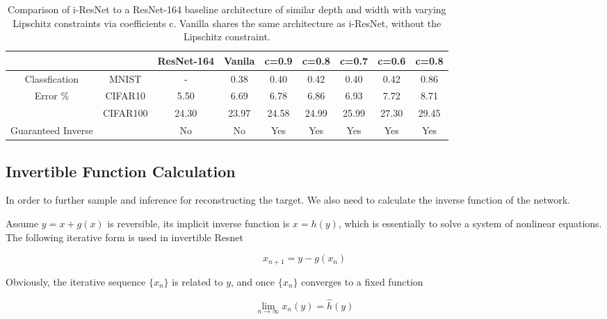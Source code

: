 \documentclass[final]{cvpr}
\begin{document}
\begin{table}[]
   \caption{Comparison of i-ResNet to a ResNet-164 baseline architecture of similar depth and width with varying Lipschitz constraints via
   coefficients c. Vanilla shares the same architecture as i-ResNet, without the Lipschitz constraint.}
   \label{table1}   

   \begin{center}
   \begin{tabular}{@{}ccccccccc@{}}
   \toprule
                      &          & ResNet-164 & Vanila & c=0.9 & c=0.8 & c=0.7 & c=0.6 & c=0.8 \\ \midrule
   Classfication      & MNIST    & -          & 0.38   & 0.40  & 0.42  & 0.40  & 0.42  & 0.86  \\
   Error \%           & CIFAR10  & 5.50       & 6.69   & 6.78  & 6.86  & 6.93  & 7.72  & 8.71  \\
                      & CIFAR100 & 24.30      & 23.97  & 24.58 & 24.99 & 25.99 & 27.30 & 29.45 \\
                      \midrule
   Guaranteed Inverse &          & No         & No     & Yes   & Yes   & Yes   & Yes   & Yes   \\ \bottomrule
   \end{tabular}
   
\end{center}
\end{table}




\subsection{Invertible Function Calculation}\label{sec32}
In order to further sample and inference for reconstructing the target. We also need to calculate the inverse function of the network.

Assume $y = x +g(x)$ is reversible, its implicit inverse function is $x = h(y)$, which is essentially to solve a system of nonlinear equations. The following iterative form is used in invertible Resnet

\begin{equation}
   x_{n+1}=y-g(x_n)
   \label{eq12}
\end{equation}

Obviously, the iterative sequence $\{x_n\}$ is related to $y$, and once $\{x_n\}$ converges to a fixed function

\begin{equation}
   \lim_{n\to\infty} x_n(y) = \hat{h}(y)
\end{equation}
\end{document}
